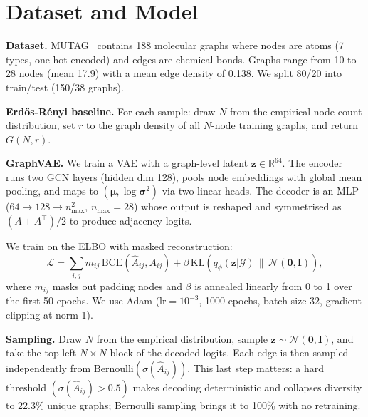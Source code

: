\section{Dataset and Model}

\textbf{Dataset.}
MUTAG~\cite{debnath1991structure} contains 188 molecular graphs where nodes are atoms (7 types, one-hot encoded) and edges are chemical bonds. Graphs range from 10 to 28 nodes (mean 17.9) with a mean edge density of 0.138. We split 80/20 into train/test (150/38 graphs).

\textbf{Erdős-Rényi baseline.}
For each sample: draw $N$ from the empirical node-count distribution, set $r$ to the graph density of all $N$-node training graphs, and return $G(N, r)$.

\textbf{GraphVAE.}
We train a VAE with a graph-level latent $\mathbf{z} \in \mathbb{R}^{64}$.
The encoder runs two GCN layers (hidden dim 128), pools node embeddings with global mean pooling, and maps to $(\boldsymbol{\mu}, \log\boldsymbol{\sigma}^2)$ via two linear heads.
The decoder is an MLP ($64 \to 128 \to n_{\max}^2$, $n_{\max}{=}28$) whose output is reshaped and symmetrised as $(A + A^\top)/2$ to produce adjacency logits.

We train on the ELBO with masked reconstruction:
\begin{equation*}
  \mathcal{L} = \sum_{i,j} m_{ij}\,\mathrm{BCE}(\hat{A}_{ij}, A_{ij})
              + \beta\,\mathrm{KL}\!\left(q_\phi(\mathbf{z}|\mathcal{G})\,\|\,\mathcal{N}(\mathbf{0},\mathbf{I})\right),
\end{equation*}
where $m_{ij}$ masks out padding nodes and $\beta$ is annealed linearly from 0 to 1 over the first 50 epochs.
We use Adam ($\text{lr}{=}10^{-3}$, 1000 epochs, batch size 32, gradient clipping at norm 1).

\textbf{Sampling.}
Draw $N$ from the empirical distribution, sample $\mathbf{z} \sim \mathcal{N}(\mathbf{0}, \mathbf{I})$, and take the top-left $N{\times}N$ block of the decoded logits.
Each edge is then sampled independently from $\mathrm{Bernoulli}(\sigma(\hat{A}_{ij}))$.
This last step matters: a hard threshold $(\sigma(\hat{A}_{ij}) > 0.5)$ makes decoding deterministic and collapses diversity to 22.3\% unique graphs; Bernoulli sampling brings it to 100\% with no retraining.
